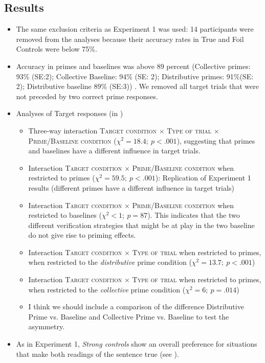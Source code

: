 \documentclass[a4paper]{article}
\newcommand{\addMM}[1]{{\leavevmode\color{red}#1}}
\begin{document}
\subsection{Results}

\begin{itemize}
\item The same exclusion criteria as Experiment 1 was used: 14 participants were removed from the analyses because their accuracy rates in True and Foil Controls were below 75\%. 

\item Accuracy in primes and baselines was above 89 percent (Collective primes: 93\% (SE:2); Collective Baseline: 94\% (SE: 2); Distributive primes: 91\%(SE: 2); Distributive baseline 89\% (SE:3)) . We removed all target trials that were not preceded by two correct prime responses. 

\item Analyses of Target responses (in )
\begin{itemize}
\item Three-way interaction \textsc{Target condition} $\times$ \textsc{Type of trial} $\times$ \textsc{Prime/Baseline condition} ($\chi^{2}=18.4; \ p<.001$), suggesting that primes and baselines have a different influence in target trials.
\item Interaction \textsc{Target condition} $\times$ \textsc{Prime/Baseline condition} when restricted to primes ($\chi^{2}=59.5;\  p<.001$): Replication of Experiment 1 results (different primes have a different influence in target trials)
\item Interaction \textsc{Target condition} $\times$ \textsc{Prime/Baseline condition} when restricted to baselines ($\chi^{2}<1; \ p=87$). This indicates that the two different verification strategies that might be at play in the two baseline do not give rise to priming effects. 
\item Interaction \textsc{Target condition} $\times$ \textsc{Type of trial} when restricted to primes, when restricted to the \emph{distributive} prime condition ($\chi^{2}=13.7; \ p<.001$)
\item Interaction \textsc{Target condition} $\times$ \textsc{Type of trial} when restricted to primes, when restricted to the \emph{collective} prime condition ($\chi^{2}=6; \ p=.014$)
\item \addMM{I think we should include a comparison of the difference Distributive Prime vs.  Baseline and Collective Prime vs. Baseline to test the asymmetry.}
\end{itemize}

\item As in Experiment 1, \textit{Strong controls} show an overall preference for situations that make both readings of the sentence true (see ). 

\end{itemize}
\end{document}
